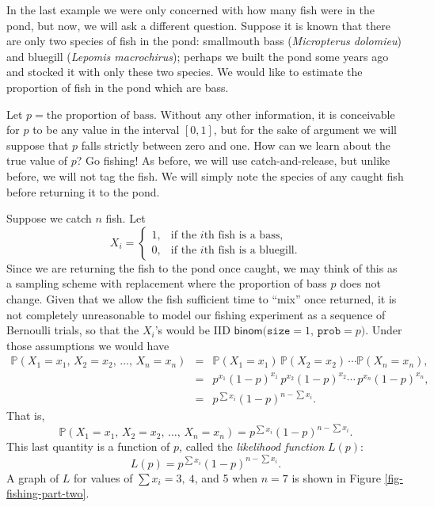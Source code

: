\documentclass[captions=tableheading]{scrbook}
\begin{document}
\begin{example}
In the last example we were only concerned with how many fish were in the pond, but now, we will ask a different question. Suppose it is known that there are only two species of fish in the pond: smallmouth bass (\emph{Micropterus dolomieu}) and bluegill (\emph{Lepomis macrochirus}); perhaps we built the pond some years ago and stocked it with only these two species. We would like to estimate the proportion of fish in the pond which are bass.

Let \(p=\mbox{the proportion of bass}\). Without any other information, it is conceivable for \(p\) to be any value in the interval \([0,1]\), but for the sake of argument we will suppose that \(p\) falls strictly between zero and one. How can we learn about the true value of \(p\)? Go fishing! As before, we will use catch-and-release, but unlike before, we will not tag the fish. We will simply note the species of any caught fish before returning it to the pond. 

Suppose we catch \(n\) fish. Let
\[
X_{i}=
\begin{cases}
1, & \mbox{if the \(i\mathrm{th}\) fish is a bass,}\\
0, & \mbox{if the \(i\mathrm{th}\) fish is a bluegill.}
\end{cases}
\]
Since we are returning the fish to the pond once caught, we may think of this as a sampling scheme with replacement where the proportion of bass \(p\) does not change. Given that we allow the fish sufficient time to ``mix'' once returned, it is not completely unreasonable to model our fishing experiment as a sequence of Bernoulli trials, so that the \(X_{i}\)'s would be IID \(\mathsf{binom(\mathtt{size}}=1,\,\mathtt{prob}=p)\). Under those assumptions we would have
\begin{eqnarray*}
\mathbb{P}(X_{1}=x_{1},\, X_{2}=x_{2},\,\ldots,\, X_{n}=x_{n}) & = & \mathbb{P}(X_{1}=x_{1})\,\mathbb{P}(X_{2}=x_{2})\,\cdots\mathbb{P}(X_{n}=x_{n}),\\
 & = & p^{x_{1}}(1-p)^{x_{1}}\, p^{x_{2}}(1-p)^{x_{2}}\cdots\, p^{x_{n}}(1-p)^{x_{n}},\\
 & = & p^{\sum x_{i}}(1-p)^{n-\sum x_{i}}.
\end{eqnarray*}
That is, 
\[
\mathbb{P}(X_{1}=x_{1},\, X_{2}=x_{2},\,\ldots,\, X_{n}=x_{n})=p^{\sum x_{i}}(1-p)^{n-\sum x_{i}}.
\]
This last quantity is a function of \(p\), called the \emph{likelihood function} \(L(p)\):
\[
L(p)=p^{\sum x_{i}}(1-p)^{n-\sum x_{i}}.
\]
A graph of \(L\) for values of \(\sum x_{i}=3,\ 4\), and 5 when \(n=7\) is shown in Figure \ref{fig-fishing-part-two}. 



\end{example}
\end{document}
